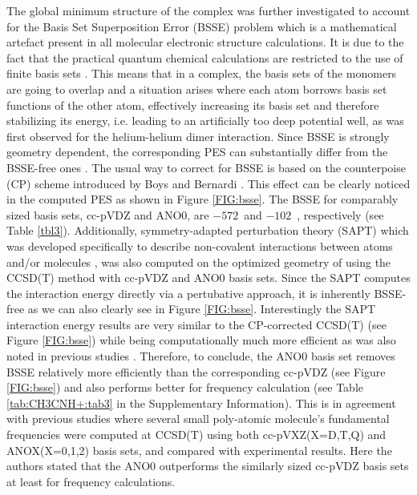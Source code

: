 The global minimum structure of the complex was further investigated to account for the Basis Set Superposition Error (BSSE) problem which is a mathematical artefact present in all molecular electronic structure calculations. It is due to the fact that the practical quantum chemical calculations are restricted to the use of finite basis sets \cite{BSSE_Galano2006}. This means that in a complex, the basis sets of the monomers are going to overlap and a situation arises where each atom borrows basis set functions of the other atom, effectively increasing its basis set and therefore stabilizing its energy, i.e. leading to an artificially too deep potential well, as was first observed for the  helium-helium dimer  interaction\cite{BSSE_Kestner1968, liu_accurate_1973}. Since BSSE is strongly geometry dependent, the corresponding PES can substantially differ from the BSSE-free ones  \cite{BSSE_SALVADOR2000}. The usual way to correct for BSSE is based on the counterpoise (CP) scheme introduced by Boys and Bernardi \cite{boys_calculation_1970}. This effect can be clearly noticed in the computed PES as shown in Figure \ref{FIG:bsse}.  The BSSE for comparably sized basis sets, cc-pVDZ and ANO0, are $-572$~\wnn and $-102$~\wn,  respectively (see Table \ref{tbl3}). Additionally, symmetry-adapted perturbation theory (SAPT) which was developed specifically to describe non-covalent interactions between atoms and/or molecules \cite{jeziorski_perturbation_1994, hohenstein_density_2010}, was also computed on the optimized geometry of \pa using the CCSD(T) method with cc-pVDZ and ANO0 basis sets. Since the SAPT computes the interaction energy directly via a pertubative approach, it is inherently BSSE-free as we can also clearly see in Figure \ref{FIG:bsse}. Interestingly the SAPT interaction energy results are very similar to the CP-corrected CCSD(T) (see Figure \ref{FIG:bsse}) while being computationally much more efficient as was also noted in previous studies \cite{SAPT_review2012}. Therefore, to conclude, the ANO0 basis set removes BSSE relatively more efficiently than the corresponding cc-pVDZ (see Figure \ref{FIG:bsse}) and also performs better for frequency calculation (see Table \ref{tab:CH3CNH+:tab3} in the Supplementary Information). This is in agreement with previous studies  \cite{mccaslin_MolPhys_111_1492_2013} where several small poly-atomic molecule's fundamental frequencies were computed at CCSD(T) using both cc-pVXZ(X=D,T,Q) and ANOX(X=0,1,2) basis sets, and compared with experimental results. Here the authors stated that the ANO0 outperforms the similarly sized cc-pVDZ basis sets at least for frequency calculations.

